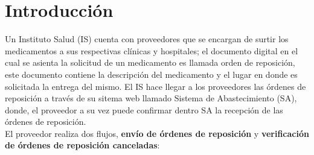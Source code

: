 \documentclass[letterpaper,11pt]{article}
\begin{document}
\section{Introducción}
Un Instituto Salud (IS) cuenta con proveedores que se encargan de surtir los medicamentos a sus respectivas clínicas y hospitales; el documento digital en el cual se asienta la solicitud de un medicamento es llamada orden de reposición, este documento contiene la descripción del medicamento y el lugar en donde es solicitada la entrega del mismo. El IS hace llegar a los proveedores las órdenes de reposición a través de su sitema web llamado Sistema de Abastecimiento (SA), donde, el proveedor a su vez puede confirmar dentro SA la recepción de las órdenes de reposición.\\
El proveedor realiza dos flujos, \textbf{envío de órdenes de reposición} y \textbf{verificación de órdenes de reposición canceladas}:
\end{document}
